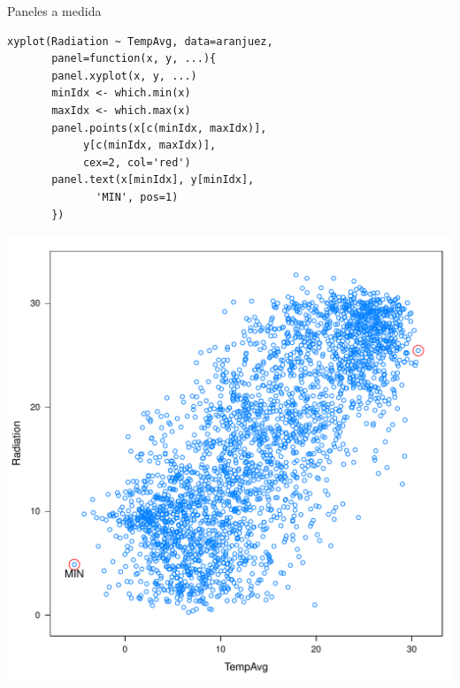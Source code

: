 \documentclass[xcolor={usenames,svgnames,dvipsnames}]{beamer}
\begin{document}
\begin{frame}[fragile,label=sec-2-1-15]{Paneles a medida}
 \lstset{language=R,numbers=none}
\begin{lstlisting}
xyplot(Radiation ~ TempAvg, data=aranjuez,
       panel=function(x, y, ...){
	   panel.xyplot(x, y, ...)
	   minIdx <- which.min(x)
	   maxIdx <- which.max(x)
	   panel.points(x[c(minIdx, maxIdx)],
			y[c(minIdx, maxIdx)],
			cex=2, col='red')
	   panel.text(x[minIdx], y[minIdx],
		      'MIN', pos=1)
	   })
\end{lstlisting}

\includegraphics[width=.9\linewidth]{figs/panel.pdf}
\end{frame}
\end{document}
